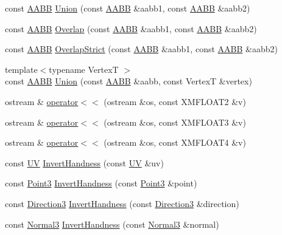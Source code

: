 \begin{DoxyCompactItemize}
\item 
const \hyperlink{structmage_1_1_a_a_b_b}{A\+A\+BB} \hyperlink{namespacemage_a14f2c20e37511b983bcb731afbb6b0b6}{Union} (const \hyperlink{structmage_1_1_a_a_b_b}{A\+A\+BB} \&aabb1, const \hyperlink{structmage_1_1_a_a_b_b}{A\+A\+BB} \&aabb2)
\item 
const \hyperlink{structmage_1_1_a_a_b_b}{A\+A\+BB} \hyperlink{namespacemage_ade79a277862009e505ce6c15ecd98cdf}{Overlap} (const \hyperlink{structmage_1_1_a_a_b_b}{A\+A\+BB} \&aabb1, const \hyperlink{structmage_1_1_a_a_b_b}{A\+A\+BB} \&aabb2)
\item 
const \hyperlink{structmage_1_1_a_a_b_b}{A\+A\+BB} \hyperlink{namespacemage_a31fba0978e5da37928e5eec83a4f784d}{Overlap\+Strict} (const \hyperlink{structmage_1_1_a_a_b_b}{A\+A\+BB} \&aabb1, const \hyperlink{structmage_1_1_a_a_b_b}{A\+A\+BB} \&aabb2)
\item 
{\footnotesize template$<$typename VertexT $>$ }\\const \hyperlink{structmage_1_1_a_a_b_b}{A\+A\+BB} \hyperlink{namespacemage_aa727c025f86c9da2b6704c5f40b3d700}{Union} (const \hyperlink{structmage_1_1_a_a_b_b}{A\+A\+BB} \&aabb, const VertexT \&vertex)
\item 
ostream \& \hyperlink{namespacemage_ac348ad49bf7e9912aa70cda1b0ca553d}{operator$<$$<$} (ostream \&os, const X\+M\+F\+L\+O\+A\+T2 \&v)
\item 
ostream \& \hyperlink{namespacemage_a44b2d3046802608544402245919f219b}{operator$<$$<$} (ostream \&os, const X\+M\+F\+L\+O\+A\+T3 \&v)
\item 
ostream \& \hyperlink{namespacemage_af6c1d1c5718d611450932bde30d2bfef}{operator$<$$<$} (ostream \&os, const X\+M\+F\+L\+O\+A\+T4 \&v)
\item 
const \hyperlink{structmage_1_1_u_v}{UV} \hyperlink{namespacemage_ae12cd160f5bc01e4ef0aa2d45a80e14c}{Invert\+Handness} (const \hyperlink{structmage_1_1_u_v}{UV} \&uv)
\item 
const \hyperlink{structmage_1_1_point3}{Point3} \hyperlink{namespacemage_a909b2d7d07a296a41c320b8fe8ab1b82}{Invert\+Handness} (const \hyperlink{structmage_1_1_point3}{Point3} \&point)
\item 
const \hyperlink{structmage_1_1_direction3}{Direction3} \hyperlink{namespacemage_a6c9899cce1f1e4d70ad74f291314a90c}{Invert\+Handness} (const \hyperlink{structmage_1_1_direction3}{Direction3} \&direction)
\item 
const \hyperlink{structmage_1_1_normal3}{Normal3} \hyperlink{namespacemage_a99775511a838e6d840a83e5ca31e3306}{Invert\+Handness} (const \hyperlink{structmage_1_1_normal3}{Normal3} \&normal)

\end{DoxyCompactItemize}

